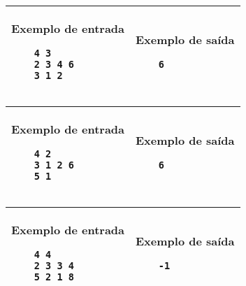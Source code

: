 \begin{table}[!h]
    \centering
    \begin{tabular}{|l|l|}
    \hline
    \begin{minipage}[t]{3in}
    \textbf{Exemplo de entrada}
    \begin{verbatim}
    4 3
    2 3 4 6
    3 1 2 
    \end{verbatim}
    \vspace{1mm}
    \end{minipage}
    &
    \begin{minipage}[t]{3in}
    \textbf{Exemplo de saída}
    \begin{verbatim}
    6
    \end{verbatim}
    \vspace{1mm}
    \end{minipage} \\
    \hline
    \end{tabular}
    \end{table}
    
    \begin{table}[!h]
    \centering
    \begin{tabular}{|l|l|}
    \hline
    \begin{minipage}[t]{3in}
    \textbf{Exemplo de entrada}
    \begin{verbatim}
    4 2
    3 1 2 6
    5 1
    \end{verbatim}
    \vspace{1mm}
    \end{minipage}
    &
    \begin{minipage}[t]{3in}
    \textbf{Exemplo de saída}
    \begin{verbatim}
    6
    \end{verbatim}
    \vspace{1mm}
    \end{minipage} \\
    \hline
    \end{tabular}
    \end{table}
    
    \begin{table}[!h]
    \centering
    \begin{tabular}{|l|l|}
    \hline
    \begin{minipage}[t]{3in}
    \textbf{Exemplo de entrada}
    \begin{verbatim}
    4 4
    2 3 3 4
    5 2 1 8
    \end{verbatim}
    \vspace{1mm}
    \end{minipage}
    &
    \begin{minipage}[t]{3in}
    \textbf{Exemplo de saída}
    \begin{verbatim}
    -1
    \end{verbatim}
    \vspace{1mm}
    \end{minipage} \\
    \hline
    \end{tabular}
    \end{table}